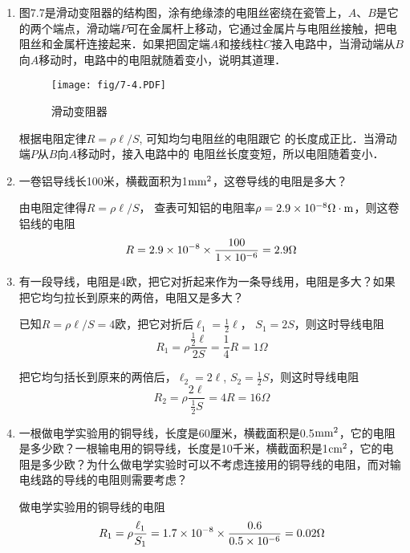 \begin{enumerate}
    \item 图7.7是滑动变阻器的结构图，涂有绝缘漆的电阻丝密绕在瓷管上，$A$、$B$是它的两个端点，滑动端$P$可在金属杆上移动，它通过金属片与电阻丝接触，把电阻丝和金属杆连接起来．如果把固定端$A$和接线柱$C$接入电路中，当滑动端从$B$向$A$移动时，电路中的电阻就随着变小，说明其道理．
    \begin{figure}[htp]\centering
       \texttt{[image: fig/7-4.PDF]}
        \caption{滑动变阻器}
        \end{figure}

\begin{solution}
    根据电阻定律$R=\rho\ell/S$,
    可知均匀电阻丝的电阻跟它
    的长度成正比．当滑动端$P$从$B$向$A$移动时，接入电路中的
    电阻丝长度变短，所以电阻随着变小．
\end{solution}

    \item 一卷铝导线长100米，横截面积为1${\rm mm}^2$，这卷导线的电阻是多大？

    \begin{solution}
        由电阻定律得$R=\rho\ell/S$，
        查表可知铝的电阻率$\rho=
        2.9\times10^{-8}\Omega\cdot {\rm m}$，则这卷铝线的电阻
\[R=2.9\times 10^{-8}\times\frac{100}{1\times 10^{-6}}=2.9\Omega\]
    \end{solution}
    
    \item 有一段导线，电阻是4欧，把它对折起来作为一条导线用，电阻是多大？如果把它均匀拉长到原来的两倍，电阻又是多大？

    \begin{solution}
已知$R=\rho\ell/S=4$欧，把它对折后$\ell_1=\frac{1}{2}\ell$，
$S_1=2S$，则这时导线电阻
\[R_1=\rho\frac{\frac{1}{2}\ell}{2S}=\frac{1}{4}R=1\Omega\]

把它均匀括长到原来的两倍后，$\ell_2=2\ell$, $S_2=\frac{1}{2}S$，则这时导线电阻
\[R_2=\rho\frac{2\ell}{\frac{1}{2}S}={4}R=16\Omega\]
    \end{solution}
    
    \item 一根做电学实验用的铜导线，长度是60厘米，横截面积是0.5${\rm mm}^2$，它的电阻是多少欧？一根输电用的铜导线，长度是10千米，横截面积是1${\rm cm}^2$，它的电阻是多少欧？为什么做电学实验时可以不考虑连接用的铜导线的电阻，而对输电线路的导线的电阻则需要考虑？

    \begin{solution}
做电学实验用的铜导线的电阻
\[R_1=\rho\frac{\ell_1}{S_1}=1.7\times 10^{-8}\times \frac{0.6}{0.5\times 10^{-6}}=0.02\Omega\]


\end{solution}
\end{enumerate}
